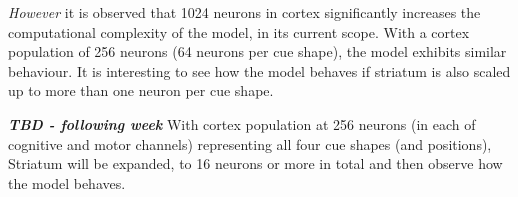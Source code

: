 \documentclass[11pt]{article}
\begin{document}
\par \emph{However} it is observed that 1024 neurons in cortex significantly increases the computational complexity of the model, in its current scope.
With a cortex population of 256 neurons (64 neurons per cue shape), the model exhibits similar behaviour. It is interesting to see how the model behaves if striatum is also scaled up to more than one neuron per cue shape.

\textbf{\emph{TBD - following week}} With cortex population at 256 neurons (in each of cognitive and motor channels) representing all four cue shapes (and positions), Striatum will be expanded, to 16 neurons or more in total and then observe how the model behaves.

\clearpage
\nocite{*}
{}

\end{document}
